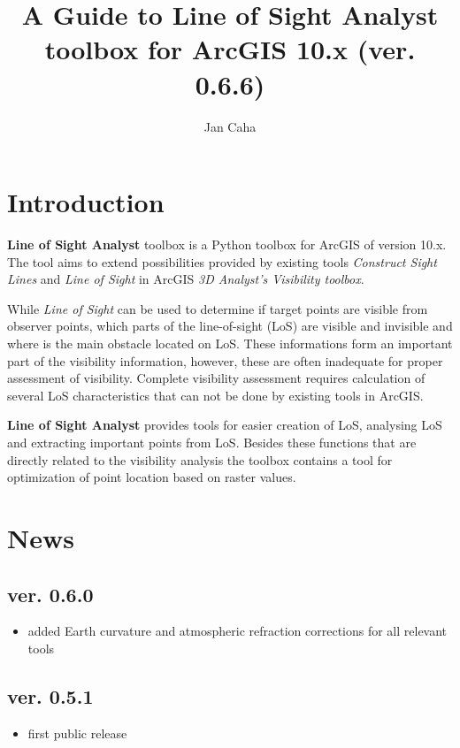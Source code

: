 \documentclass[]{article}
\title{A Guide to \textbf{Line of Sight Analyst} toolbox for ArcGIS 10.x (ver. 0.6.6)}
\author[*]{Jan Caha}
\affil[*]{email: \textit{jan.caha@outlook.com}}
\begin{document}
\maketitle

\setcounter{tocdepth}{2}
\tableofcontents

\section{Introduction}

\textbf{Line of Sight Analyst} toolbox is a Python toolbox for ArcGIS of version 10.x. The tool aims to extend possibilities provided by existing tools \textit{Construct Sight Lines} and \textit{Line of Sight} in ArcGIS \textit{3D Analyst's Visibility toolbox}.

While \textit{Line of Sight} can be used to determine if target points are visible from observer points, which parts of the line-of-sight (LoS) are visible and invisible and where is the main obstacle located on LoS. These informations form an important part of the visibility information, however, these are often inadequate for proper assessment of visibility. Complete visibility assessment requires calculation of several LoS characteristics that can not be done by existing tools in ArcGIS.

\textbf{Line of Sight Analyst} provides tools for easier creation of LoS, analysing LoS and extracting important points from LoS. Besides these functions that are directly related to the visibility analysis the toolbox contains a tool for optimization of point location based on raster values.

\section{News}

\subsection*{ver. 0.6.0}
\begin{itemize}
	\item added Earth curvature and atmospheric refraction corrections for all relevant tools
\end{itemize}

\subsection*{ver. 0.5.1}
\begin{itemize}
	\item first public release
\end{itemize}
\end{document}
